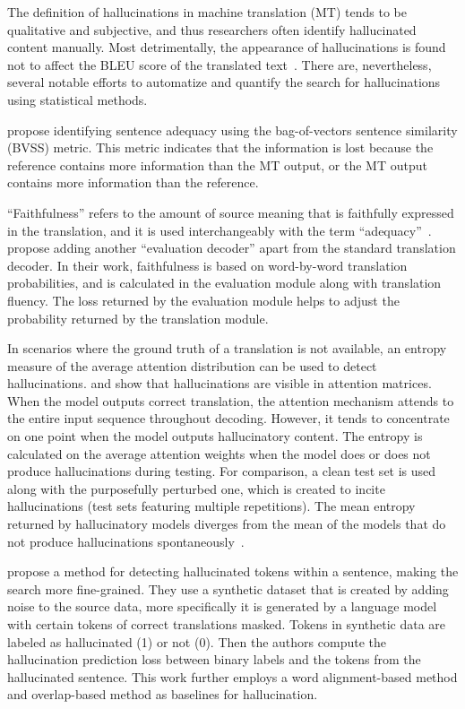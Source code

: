 The definition of hallucinations in machine translation (MT) tends to be qualitative and subjective, and thus researchers often identify hallucinated content manually. Most detrimentally, the appearance of hallucinations is found not to affect the BLEU score of the translated text~. There are, nevertheless, several notable efforts to automatize and quantify the search for hallucinations using statistical methods.

 propose identifying sentence adequacy using the bag-of-vectors sentence similarity (BVSS) metric. This metric indicates that the information is lost because the reference contains more information than the MT output, or the MT output contains more information than the reference.



\label{sec: auxiliary decoder}
“Faithfulness” refers to the amount of source meaning that is faithfully expressed in the translation, and it is used interchangeably with the term “adequacy”~.  propose adding another “evaluation decoder” apart from the standard translation decoder.  In their work, faithfulness is based on word-by-word translation probabilities, and is calculated in the evaluation module along with translation fluency. The loss returned by the evaluation module helps to adjust the probability returned by the translation module.

\label{sec: entropy_measure}
In scenarios where the ground truth of a translation is not available, an entropy measure of the average attention distribution can be used to detect hallucinations.  and  show that hallucinations are visible in attention matrices. When the model outputs correct translation, the attention mechanism attends to the entire input sequence throughout decoding. However, it tends to concentrate on one point when the model outputs hallucinatory content. 
The entropy is calculated on the average attention weights when the model does or does not produce hallucinations during testing. 
For comparison, a clean test set is used along with the purposefully perturbed one, which is created to incite hallucinations (test sets featuring multiple repetitions). 
The mean entropy returned by hallucinatory models diverges from the mean of the models that do not produce hallucinations spontaneously~.

\label{paragraph: token_level}
 propose a method for detecting hallucinated tokens within a sentence, making the search more fine-grained. They use a synthetic dataset that is created by adding noise to the source data, more specifically it is generated by a language model with certain tokens of correct translations masked. Tokens in synthetic data are labeled as hallucinated (1) or not (0). Then the authors compute the hallucination prediction loss between binary labels and the tokens from the hallucinated sentence.
This work further employs a word alignment-based method and overlap-based method as baselines for hallucination.

